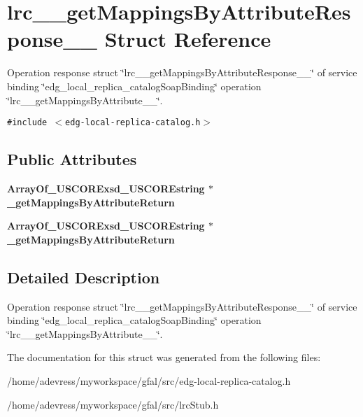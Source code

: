 \section{lrc\_\-\_\-get\-Mappings\-By\-Attribute\-Response\_\-\_\- Struct Reference}
\label{structlrc____getMappingsByAttributeResponse____}
Operation response struct \char`\"{}lrc\_\-\_\-get\-Mappings\-By\-Attribute\-Response\_\-\_\-\char`\"{} of service binding \char`\"{}edg\_\-local\_\-replica\_\-catalog\-Soap\-Binding\char`\"{} operation \char`\"{}lrc\_\-\_\-get\-Mappings\-By\-Attribute\_\-\_\-\char`\"{}.  


{\tt \#include $<$edg-local-replica-catalog.h$>$}

\subsection*{Public Attributes}
\begin{CompactItemize}
\item 
\bf{Array\-Of\_\-USCORExsd\_\-USCOREstring} $\ast$ \textbf{\_\-get\-Mappings\-By\-Attribute\-Return}\label{structlrc____getMappingsByAttributeResponse_____dde66796b0828376ec1644993f4e1d15}

\item 
\bf{Array\-Of\_\-USCORExsd\_\-USCOREstring} $\ast$ \textbf{\_\-get\-Mappings\-By\-Attribute\-Return}\label{structlrc____getMappingsByAttributeResponse_____dde66796b0828376ec1644993f4e1d15}

\end{CompactItemize}


\subsection{Detailed Description}
Operation response struct \char`\"{}lrc\_\-\_\-get\-Mappings\-By\-Attribute\-Response\_\-\_\-\char`\"{} of service binding \char`\"{}edg\_\-local\_\-replica\_\-catalog\-Soap\-Binding\char`\"{} operation \char`\"{}lrc\_\-\_\-get\-Mappings\-By\-Attribute\_\-\_\-\char`\"{}. 



The documentation for this struct was generated from the following files:\begin{CompactItemize}
\item 
/home/adevress/myworkspace/gfal/src/edg-local-replica-catalog.h\item 
/home/adevress/myworkspace/gfal/src/lrc\-Stub.h\end{CompactItemize}
